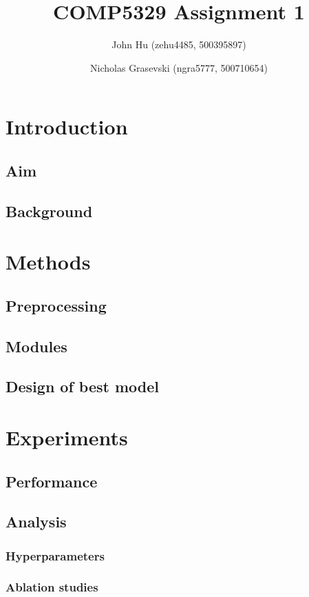 \documentclass{article}
\title{COMP5329 Assignment 1}
\author{John Hu (zehu4485, 500395897) \and Nicholas Grasevski (ngra5777, 500710654)}
\begin{document}
\maketitle
\begin{abstract}
\end{abstract}

\section{Introduction}
\subsection{Aim}
\subsection{Background}

\section{Methods}
\subsection{Preprocessing}
\subsection{Modules}
\subsection{Design of best model}

\section{Experiments}
\subsection{Performance}
\subsection{Analysis}
\subsubsection{Hyperparameters}
\subsubsection{Ablation studies}
\end{document}
